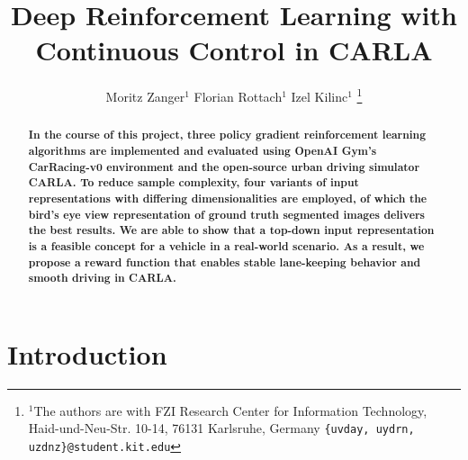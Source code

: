 \documentclass[letterpaper, 10 pt, conference]{ieeeconf}  %
\title{\LARGE \bf
Deep Reinforcement Learning with Continuous Control in CARLA
}
\author{Moritz Zanger$^{1}$ Florian Rottach$^{1}$ Izel Kilinc$^{1}$ %
\thanks{$^{1}$The authors are with FZI Research Center for Information Technology, Haid-und-Neu-Str. 10-14, 76131 Karlsruhe, Germany
        {\tt\small \{uvday, uydrn, uzdnz\}@student.kit.edu}}%
}
\begin{document}
\maketitle
\thispagestyle{empty}
\pagestyle{empty}


\begin{abstract}


\textbf{In the course of this project, three policy gradient reinforcement learning algorithms are implemented and evaluated using OpenAI Gym's CarRacing-v0 environment and the open-source urban driving simulator CARLA. To reduce sample complexity, four variants of input representations with differing dimensionalities are employed, of which the bird's eye view representation of ground truth segmented images delivers the best results. We are able to show that a top-down input representation is a feasible concept for a vehicle in a real-world scenario. As a result, we propose a reward function that enables stable lane-keeping behavior and smooth driving in CARLA.}
\end{abstract}


\section{Introduction}

\end{document}
